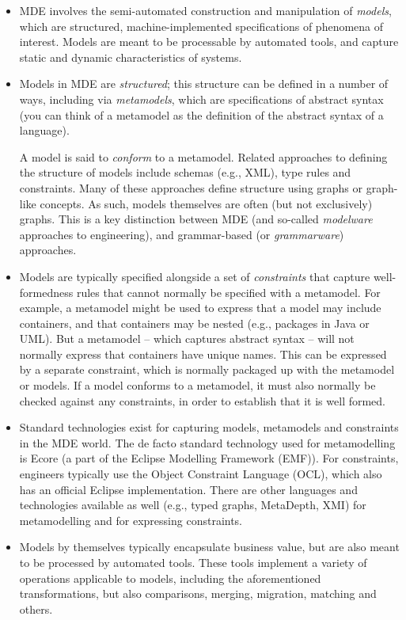 \begin{itemize}
\item MDE involves the semi-automated construction and manipulation of \textit{models}, which are structured, machine-implemented specifications of phenomena of interest. Models are meant to be processable by automated tools, and capture static and dynamic characteristics of systems. 

\item Models in MDE are \textit{structured}; this structure can be defined in a number of ways, including via \textit{metamodels}, which are specifications of abstract syntax (you can think of a metamodel as the definition of the abstract syntax of a language). 

A model is said to \textit{conform} to a metamodel. Related approaches to defining the structure of models include schemas (e.g., XML), type rules and constraints. Many of these approaches define structure using graphs or graph-like concepts. As such, models themselves are often (but not exclusively) graphs. This is a key distinction between MDE (and so-called \textit{modelware} approaches to engineering), and grammar-based (or \textit{grammarware}) approaches.

\item Models are typically specified alongside a set of \textit{constraints} that capture well-formedness rules that cannot normally be specified with a metamodel. For example, a metamodel might be used to express that a model may include containers, and that containers may be nested (e.g., packages in Java or UML). But a metamodel -- which captures abstract syntax -- will not normally express that containers have unique names. This can be expressed by a separate constraint, which is normally packaged up with the metamodel or models. If a model conforms to a metamodel, it must also normally be checked against any constraints, in order to establish that it is well formed.

\item Standard technologies exist for capturing models, metamodels and constraints in the MDE world. The de facto standard technology used for metamodelling is Ecore (a part of the Eclipse Modelling Framework (EMF)). For constraints, engineers typically use the Object Constraint Language (OCL), which also has an official Eclipse implementation. There are other languages and technologies available as well (e.g., typed graphs, MetaDepth, XMI) for metamodelling and for expressing constraints.

\item Models by themselves typically encapsulate business value, but are also meant to be processed by automated tools. These tools implement a variety of operations applicable to models, including the aforementioned transformations, but also comparisons, merging, migration, matching and others.
\end{itemize}

